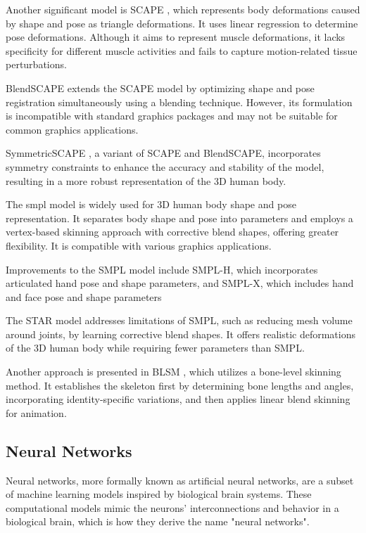 Another significant model is SCAPE \cite{scape}, which represents body
deformations caused by shape and pose as triangle deformations. It uses linear
regression to determine pose deformations. Although it aims to represent muscle
deformations, it lacks specificity for different muscle activities and fails to
capture motion-related tissue perturbations.

BlendSCAPE \cite{blendscape} extends the SCAPE model by optimizing shape and
pose registration simultaneously using a blending technique. However, its
formulation is incompatible with standard graphics packages and may not be
suitable for common graphics applications.

SymmetricSCAPE \cite{CHEN201952}, a variant of SCAPE and BlendSCAPE,
incorporates symmetry constraints to enhance the accuracy and stability of the
model, resulting in a more robust representation of the 3D human body.

The \gls{smpl} \cite{SMPL:2015} model is widely used for 3D human body shape
and pose representation. It separates body shape and pose into parameters and
employs a vertex-based skinning approach with corrective blend shapes, offering
greater flexibility. It is compatible with various graphics applications.

Improvements to the SMPL model include SMPL-H, which incorporates articulated
hand pose and shape parameters, and SMPL-X, which includes hand and face pose
and shape parameters \cite{SMPL-X:2019}

The STAR model \cite{STAR:2020} addresses limitations of SMPL, such as reducing
mesh volume around joints, by learning corrective blend shapes. It offers
realistic deformations of the 3D human body while requiring fewer parameters
than SMPL.

Another approach is presented in BLSM \cite{doi:10.1007/978-3-030-58558-7_1},
which utilizes a bone-level skinning method. It establishes the skeleton first
by determining bone lengths and angles, incorporating identity-specific
variations, and then applies linear blend skinning for animation.

\subsection{Neural Networks}

Neural networks, more formally known as artificial neural networks, are a
subset of machine learning models inspired by biological brain systems. These
computational models mimic the neurons' interconnections and behavior in a
biological brain, which is how they derive the name "neural networks".

